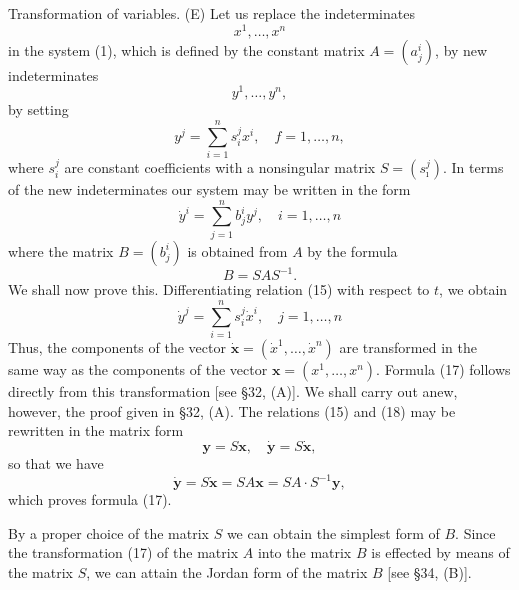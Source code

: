 \documentclass[10pt,a5paper]{book}
\theoremstyle{plain}
\theoremstyle{definition}
\theoremstyle{remark}
\begin{document}
Transformation of variables. (E) Let us replace the indeterminates
\begin{equation*}
x^{1}, \ldots, x^{n} \tag{13}
\end{equation*}
in the system (1), which is defined by the constant matrix $A=\left(a_{j}^{i}\right)$, by new indeterminates
\begin{equation*}
y^{1}, \ldots, y^{n}, \tag{14}
\end{equation*}
by setting
\begin{equation*}
y^{j}=\sum_{i=1}^{n} s_{i}^{j} x^{i}, \quad f=1, \ldots, n, \tag{15}
\end{equation*}
where $s_{i}^{j}$ are constant coefficients with a nonsingular matrix $S=\left(s_{\imath}^{j}\right)$. In terms of the new indeterminates our system may be written in the form
\begin{equation*}
\dot{y}^{i}=\sum_{j=1}^{n} b_{j}^{i} y^{j}, \quad i=1, \ldots, n \tag{16}
\end{equation*}
where the matrix $B=\left(b_{j}^{i}\right)$ is obtained from $A$ by the formula
\begin{equation*}
B=S A S^{-1} . \tag{17}
\end{equation*}
We shall now prove this. Differentiating relation (15) with respect to $t$, we obtain
\begin{equation*}
\dot{y}^{j}=\sum_{i=1}^{n} s_{i}^{j} \dot{x}^{i}, \quad j=1, \ldots, n \tag{18}
\end{equation*}
Thus, the components of the vector $\dot{\mathbf{x}}=\left(\dot{x}^{1}, \ldots, \dot{x}^{n}\right)$ are transformed in
the same way as the components of the vector $\mathbf{x}=\left(x^{1}, \ldots, x^{n}\right)$. Formula (17) follows directly from this transformation [see §32, (A)]. We shall carry out anew, however, the proof given in §32, (A). The relations (15) and (18) may be rewritten in the matrix form
\[
\mathbf{y}=S \mathbf{x}, \quad \dot{\mathbf{y}}=S \dot{\mathbf{x}},
\]
so that we have
\[
\dot{\mathbf{y}}=S \dot{\mathbf{x}}=S A \mathbf{x}=S A \cdot S^{-1} \mathbf{y},
\]
which proves formula (17).

By a proper choice of the matrix $S$ we can obtain the simplest form of $B$. Since the transformation (17) of the matrix $A$ into the matrix $B$ is effected by means of the matrix $S$, we can attain the Jordan form of the matrix $B$ [see §34, (B)].
\end{document}

